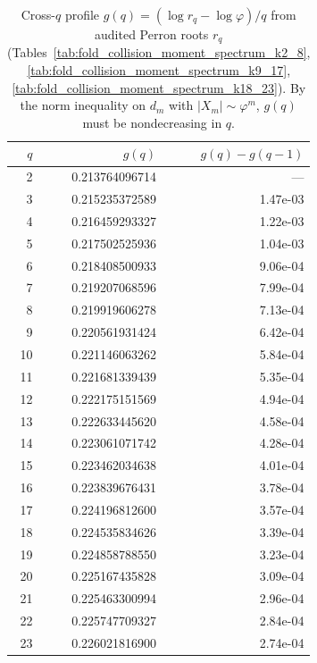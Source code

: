 \begin{table}[H]
\centering
\scriptsize
\setlength{\tabcolsep}{6pt}
\caption{Cross-$q$ profile $g(q)=(\log r_q-\log\varphi)/q$ from audited Perron roots $r_q$ (Tables~\ref{tab:fold_collision_moment_spectrum_k2_8}, \ref{tab:fold_collision_moment_spectrum_k9_17}, \ref{tab:fold_collision_moment_spectrum_k18_23}). By the norm inequality on $d_m$ with $|X_m|\sim\varphi^m$, $g(q)$ must be nondecreasing in $q$.}
\label{tab:fold_collision_crossq_g_profile_q2_23}
\begin{tabular}{r r r}
\toprule
$q$ & $g(q)$ & $g(q)-g(q-1)$\\
\midrule
2 & 0.213764096714 & ---\\
3 & 0.215235372589 & 1.47e-03\\
4 & 0.216459293327 & 1.22e-03\\
5 & 0.217502525936 & 1.04e-03\\
6 & 0.218408500933 & 9.06e-04\\
7 & 0.219207068596 & 7.99e-04\\
8 & 0.219919606278 & 7.13e-04\\
9 & 0.220561931424 & 6.42e-04\\
10 & 0.221146063262 & 5.84e-04\\
11 & 0.221681339439 & 5.35e-04\\
12 & 0.222175151569 & 4.94e-04\\
13 & 0.222633445620 & 4.58e-04\\
14 & 0.223061071742 & 4.28e-04\\
15 & 0.223462034638 & 4.01e-04\\
16 & 0.223839676431 & 3.78e-04\\
17 & 0.224196812600 & 3.57e-04\\
18 & 0.224535834626 & 3.39e-04\\
19 & 0.224858788550 & 3.23e-04\\
20 & 0.225167435828 & 3.09e-04\\
21 & 0.225463300994 & 2.96e-04\\
22 & 0.225747709327 & 2.84e-04\\
23 & 0.226021816900 & 2.74e-04\\
\bottomrule
\end{tabular}
\end{table}
